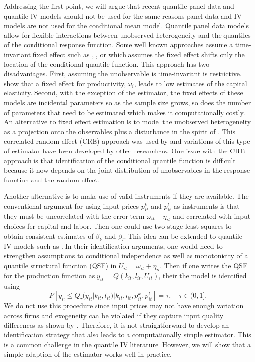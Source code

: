 \documentclass[11pt]{article}
\begin{document}
Addressing the first point, we will argue that recent quantile panel data and quantile IV models should not be used for the same reasons panel data and IV models are not used for the conditional mean model. Quantile panel data models allow for flexible interactions between unobserved heterogeneity and the quantiles of the conditional response function. Some well known approaches assume a time-invariant fixed effect such as \cite{Koenker2004}, \cite{Lamarche2010}, or \cite{Canay2011} which assumes the fixed effect shifts only the location of the conditional quantile function. This approach has two disadvantages. First, assuming the unobservable is time-invariant is restrictive. \cite{Griliches1986} show that a fixed effect for productivity, $\omega_{i}$, leads to low estimates of the capital elasticity. Second, with the exception of the \cite{Canay2011} estimator, the fixed effects of these models are incidental parameters so as the sample size grows, so does the number of parameters that need to be estimated which makes it computationally costly. An alternative to fixed effect estimation is to model the unobserved heterogeneity as a projection onto the observables plus a disturbance in the spirit of \cite{Chamberlain1984}. This correlated random effect (CRE) approach was used by \cite{Abrevaya2008} and variations of this type of estimator have been developed by other researchers. One issue with the CRE approach is that identification of the conditional quantile function is difficult because it now depends on the joint distribution of unobservables in the response function and the random effect.

Another alternative is to make use of valid instruments if they are available. The conventional argument for using input prices $p^{k}_{it}$ and $p^{l}_{it}$ as instruments is that they must be uncorrelated with the error term $\omega_{it}+\eta_{it}$ and correlated with input choices for capital and labor. Then one could use two-stage least squares to obtain consistent estimates of $\beta_{k}$ and $\beta_{l}$. This idea can be extended to quantile-IV models such as \cite{Chernozhukov2005}. In their identification arguments, one would need to strengthen assumptions to conditional independence as well as monotonicity of a quantile structural function (QSF) in $U_{it}=\omega_{it}+\eta_{it}$. Then if one writes the QSF for the production function as $y_{it}=Q(k_{it}, l_{it}, U_{it})$, their the model is identified using
\begin{equation}
P[y_{it}\leq Q_{\tau}(y_{it}|k_{it}, l_{it})|k_{it}, l_{it}, p^{k}_{it}, p^{l}_{it}]=\tau, \quad \tau\in (0,1].
\end{equation}
We do not use this procedure since input prices may not have enough variation across firms and exogeneity can be violated if they capture input quality differences as shown by \cite{Griliches1986}. Therefore, it is not straightforward to develop an identification strategy that also leads to a computationally simple estimator. This is a common challenge in the quantile IV literature. However, we will show that a simple adaption of the \cite{Canay2011} estimator works well in practice.
\end{document}
